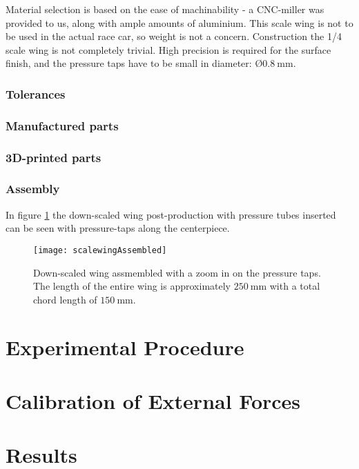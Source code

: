 
      Material selection is based on the ease of machinability - a CNC-miller was provided to us, along with ample amounts of aluminium. This scale wing is not to be used in the actual race car, so weight is not a concern. Construction the 1/4 scale wing is not completely trivial. High precision is required for the surface finish, and the pressure taps have to be small in diameter: $Ø\SI{0.8}{\milli\metre}$. 



      \subsubsection{Tolerances}

      \subsubsection{Manufactured parts}



        \subsubsection{3D-printed parts}
        \subsubsection{Assembly}

        In figure \ref{fig:scalewing} the down-scaled wing post-production with pressure tubes inserted can be seen with pressure-taps along the centerpiece.

        \begin{figure}
          \texttt{[image: scalewingAssembled]}
          \caption{Down-scaled wing assmembled with a zoom in on the pressure taps. The length of the entire wing is approximately $\SI{250}{\milli\metre}$ with a total chord length of $\SI{150}{\milli\metre}$.}
          \label{fig:scalewing}
        \end{figure}

\section{Experimental Procedure}

  \section{Calibration of External Forces}


\section{Results}

